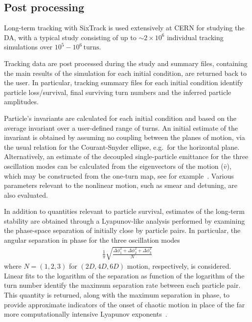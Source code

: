 \documentclass[a4paper,
              ]{jacow}
\begin{document}
\subsection{Post processing}

Long-term tracking with SixTrack is used extensively at CERN for studying the DA, with a typical study consisting of up to $\sim 2\times 10^{6}$ individual tracking simulations over $10^5-10^6\,\mathrm{turns}$.

Tracking data are post processed during the study and summary files, containing the main results of the simulation for each initial condition, are returned back to the user. In particular, tracking summary files for each initial condition identify particle loss/survival, final surviving turn numbers and the inferred particle amplitudes.

Particle's invariants are calculated for each initial condition and based on the average invariant over a user-defined range of turns.
An initial estimate of the invariant is obtained by assuming no coupling between the planes of motion, via the usual relation for the Courant-Snyder ellipse, e.g.\ for the horizontal plane.
Alternatively, an estimate of the decoupled single-particle emittance for the three oscillation modes can be calculated from the eigenvectors of the motion ($\bar{v}$), which may be constructed from the one-turn map, see for example~\cite{maisripken}. Various parameters relevant to the nonlinear motion, such as smear and detuning, are also evaluated.

In addition to quantities relevant to particle survival, estimates of the long-term stability are obtained through a Lyapunov-like analysis performed by examining the phase-space separation of initially close by particle pairs. In particular, the angular separation in phase for the three oscillation modes
\begin{align}
&\frac{1}{\pi}\sqrt{\frac{ \Delta\phi_{1}^2 + \Delta\phi_{2}^2 + \Delta\phi_{3}^2 }{N}}&\nonumber
\end{align}
where $N=(1,2,3)$ for $(2D,4D,6D)$ motion, respectively, is considered. Linear fits to the logarithm of the separation as function of the logarithm of the turn number identify the maximum separation rate between each particle pair. This quantity is returned, along with the maximum separation in phase, to provide approximate indicators of the onset of chaotic motion in place of the far more computationally intensive Lyapunov exponents~\cite{chaosproxy,distanceslope}.
\end{document}
